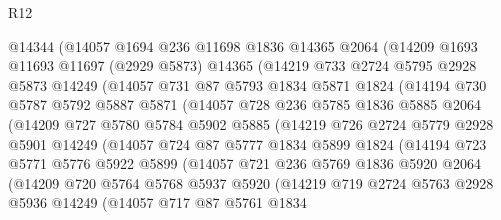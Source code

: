 \begin{lexlean}{R12}
\begin{coremodule}
        @14344
        (@14057
          @1694
          @236
          @11698
          @1836
          @14365
          @2064
          (@14209
            @1693
            @11693
            @11697
            (@2929 @5873)
            @14365
            (@14219
              @733
              @2724
              @5795
              @2928
              @5873
              @14249
              (@14057
                @731
                @87
                @5793
                @1834
                @5871
                @1824
                (@14194
                  @730
                  @5787
                  @5792
                  @5887
                  @5871
                  (@14057
                    @728
                    @236
                    @5785
                    @1836
                    @5885
                    @2064
                    (@14209
                      @727
                      @5780
                      @5784
                      @5902
                      @5885
                      (@14219
                        @726
                        @2724
                        @5779
                        @2928
                        @5901
                        @14249
                        (@14057
                          @724
                          @87
                          @5777
                          @1834
                          @5899
                          @1824
                          (@14194
                            @723
                            @5771
                            @5776
                            @5922
                            @5899
                            (@14057
                              @721
                              @236
                              @5769
                              @1836
                              @5920
                              @2064
                              (@14209
                                @720
                                @5764
                                @5768
                                @5937
                                @5920
                                (@14219
                                  @719
                                  @2724
                                  @5763
                                  @2928
                                  @5936
                                  @14249
                                  (@14057
                                    @717
                                    @87
                                    @5761
                                    @1834

\end{coremodule}
\end{lexlean}
